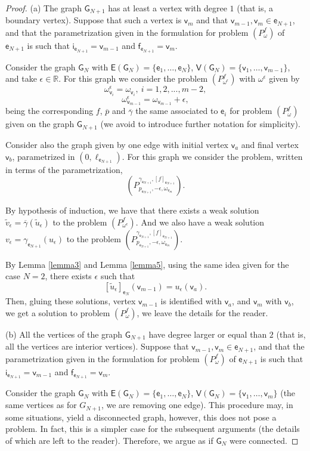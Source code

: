 \documentclass[reqno,12pt]{amsart}
\def\e{\mathsf{e}} 	%
\def\v{\mathsf{v}}	%
\newcommand{\vi}{\mathsf{i}} %
\newcommand{\vf}{\mathsf{f}} %
\newcommand{\G}{\mathsf{G}}	%
\newcommand{\V}{\mathsf{V}}	%
\newcommand{\E}{\mathsf{E}}	%
\numberwithin{equation}{section} %
\begin{document}
\begin{proof}
\noindent (a) The graph $\G_{N+1}$ has at least a vertex with degree $1$  (that is, a boundary vertex). Suppose that such a vertex is $\v_m$ and that $\v_{m-1},\v_m\in \e_{N+1}$, and that the parametrization given in the formulation for  problem $(P_\omega^f)$ of $\e_{N+1}$ is such that $\vi_{\e_{N+1}}=\v_{m-1}$ and $\vf_{\e_{N+1}}=\v_m$.

Consider the graph $\G_N$ with $\E(\G_{N}) = \{ \e_1, \ldots, \e_N \}$, $\V(\G_{N}) = \{ \v_1, \ldots, \v_{m-1} \}$, and take $\epsilon\in \mathbb{R}$. For this graph we  consider the problem $(P_{\omega^\epsilon}^f)$ with $\omega^{\epsilon}$ given by 
$$\omega^\epsilon_{\v_i}=\omega_{\v_i},\ i=1,2,...,m-2,$$
$$\omega^\epsilon_{\v_{m-1}}=\omega_{\v_{m-1}}+\epsilon,$$
being the corresponding $f$, $\overline{p}$ and $\overline{\gamma}$ the same associated to $\e_i$ for problem $(P_\omega^f)$ given on the graph $\G_{N+1}$ (we avoid to introduce further notation for simplicity).


Consider also the graph given by one edge with initial vertex $\v_a$ and final vertex $\v_b$, parametrized in $(0,\ell_{\e_{N+1}})$. 
For this graph we consider the problem, written in terms of the parametrization,
$$(P_{p_{\e_{N+1}},-\epsilon,\omega_{\v_m}}^{\gamma_{\e_{N+1}},[f]_{\e_{N+1}}}).$$
 
By   hypothesis of induction, we have that there exists  a weak solution $\tilde v_{\epsilon}=\overline{\gamma}(\tilde u_{\epsilon})$ to the problem $(P_{\omega^\epsilon}^f)$. And we also have     a weak solution $ v_{\epsilon}=\gamma_{\e_{N+1}}(u_{\epsilon})$ to the problem  $(P_{p_{\e_{N+1}},-\epsilon,\omega_{\v_m}}^{\gamma_{\e_{N+1}},[f]_{\e_{N+1}}})$.

By Lemma \ref{lemma3}  and Lemma \ref{lemma5}, using the same idea given for the case $N=2$, there exists $\epsilon$ such that 
$$[\tilde{u}_{\epsilon}]_{\e_N}(\v_{m-1}) = u_{\epsilon}(\v_a).$$
 Then, gluing these solutions, vertex $\v_{m-1}$ is identified with $\v_a$, and $\v_m$ with $\v_b$, we get a solution to  problem $(P_\omega^f)$, we leave the details for the reader.
 

\noindent (b) All the vertices of the graph $\G_{N+1}$ have degree larger or equal than $2$  (that is, all the vertices are interior vertices).  
 Suppose that  $\v_{m-1},\v_m\in \e_{N+1}$, and that the parametrization given in the formulation for  problem $(P_\omega^f)$ of $\e_{N+1}$ is such that $\vi_{\e_{N+1}}=\v_{m-1}$ and $\vf_{\e_{N+1}}=\v_m$.

Consider the graph $\G_N$ with $\E(\G_{N}) = \{ \e_1, \ldots, \e_N \}$, $\V(\G_{N}) = \{ \v_1, \ldots, \v_{m} \}$ (the same vertices as for $G_{N+1}$, we are removing one edge).  This procedure may, in some situations, yield a disconnected graph, however, this does not pose a problem. In fact, this is a simpler case for the subsequent arguments (the details of which are left to the reader). Therefore, we  argue as if $\G_N$ were connected.


\end{proof}
\end{document}
